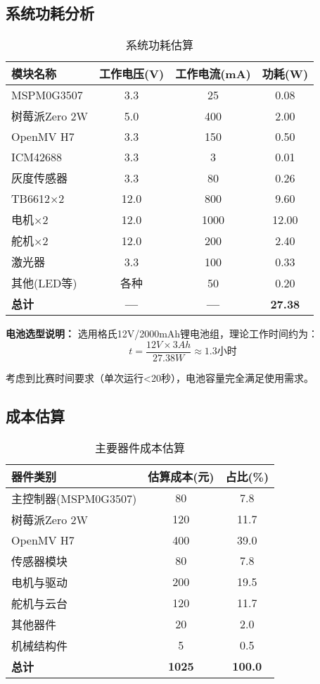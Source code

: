 \documentclass[UTF-8,zihao=-4]{ctexart}
\begin{document}
\subsection{系统功耗分析}
\begin{table}[H]
    \centering
    \caption{系统功耗估算}
    \label{tab:power}
    \begin{tabular}{lccc}
        \toprule
        模块名称 & 工作电压(V) & 工作电流(mA) & 功耗(W) \\
        \midrule
        MSPM0G3507 & 3.3 & 25 & 0.08 \\
        树莓派Zero 2W & 5.0 & 400 & 2.00 \\
        OpenMV H7 & 3.3 & 150 & 0.50 \\
        ICM42688 & 3.3 & 3 & 0.01 \\
        灰度传感器 & 3.3 & 80 & 0.26 \\
        TB6612×2 & 12.0 & 800 & 9.60 \\
        电机×2 & 12.0 & 1000 & 12.00 \\
        舵机×2 & 12.0 & 200 & 2.40 \\
        激光器 & 3.3 & 100 & 0.33 \\
        其他(LED等) & 各种 & 50 & 0.20 \\
        \midrule
        \textbf{总计} & \textbf{—} & \textbf{—} & \textbf{27.38} \\
        \bottomrule
    \end{tabular}
\end{table}

\textbf{电池选型说明：}
选用格氏12V/2000mAh锂电池组，理论工作时间约为：
\begin{equation}
    t = \frac{12V \times 3Ah}{27.38W} \approx 1.3 \text{小时}
\end{equation}

考虑到比赛时间要求（单次运行<20秒），电池容量完全满足使用需求。

\subsection{成本估算}
\begin{table}[H]
    \centering
    \caption{主要器件成本估算}
    \label{tab:cost}
    \begin{tabular}{lcc}
        \toprule
        器件类别 & 估算成本(元) & 占比(\%) \\
        \midrule
        主控制器(MSPM0G3507) & 80 & 7.8 \\
        树莓派Zero 2W & 120 & 11.7 \\
        OpenMV H7 & 400 & 39.0 \\
        传感器模块 & 80 & 7.8 \\
        电机与驱动 & 200 & 19.5 \\
        舵机与云台 & 120 & 11.7 \\
        其他器件 & 20 & 2.0 \\
        机械结构件 & 5 & 0.5 \\
        \midrule
        \textbf{总计} & \textbf{1025} & \textbf{100.0} \\
        \bottomrule
    \end{tabular}
\end{table}
\end{document}
